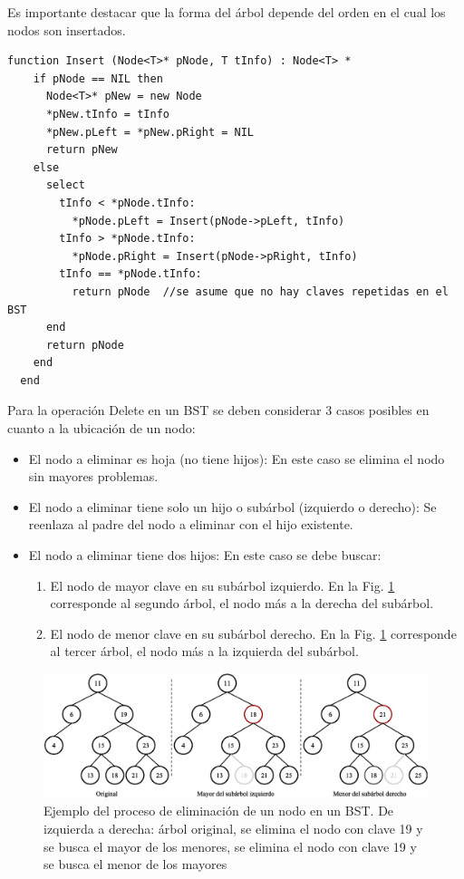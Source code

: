 Es importante destacar que la forma del árbol depende del orden en el cual los nodos son insertados.

\begin{lstlisting}[upquote=true, language=pseudo]
  function Insert (Node<T>* pNode, T tInfo) : Node<T> *
    if pNode == NIL then
      Node<T>* pNew = new Node
      *pNew.tInfo = tInfo
      *pNew.pLeft = *pNew.pRight = NIL
      return pNew
    else
      select
        tInfo < *pNode.tInfo:
          *pNode.pLeft = Insert(pNode->pLeft, tInfo)
        tInfo > *pNode.tInfo:  
          *pNode.pRight = Insert(pNode->pRight, tInfo)
        tInfo == *pNode.tInfo:
          return pNode	//se asume que no hay claves repetidas en el BST
      end
      return pNode
    end
  end
\end{lstlisting}

Para la operación Delete en un BST se deben considerar 3 casos posibles en cuanto a la ubicación de un nodo:
\begin{itemize}
\item El nodo a eliminar es hoja (no tiene hijos): En este caso se elimina el nodo sin
mayores problemas.
\item El nodo a eliminar tiene solo un hijo o subárbol (izquierdo o derecho): Se reenlaza
al padre del nodo a eliminar con el hijo existente.
\item El nodo a eliminar tiene dos hijos: En este caso se debe buscar:
\begin{enumerate}
\item El nodo de mayor clave en su subárbol izquierdo. En la Fig. \ref{fig:delsbt1} corresponde al segundo árbol, el nodo más a la derecha del subárbol.
\item El nodo de menor clave en su subárbol derecho. En la Fig. \ref{fig:delsbt1} corresponde al tercer árbol, el nodo más a la izquierda del subárbol.
\end{enumerate}
\end{itemize}

\begin{figure}[htpb!]
  \begin{center}
    \includegraphics[width=1.0\columnwidth]{images/BSTDelete1.eps}
  \end{center}
  \caption{Ejemplo del proceso de eliminación de un nodo en un BST. De izquierda a derecha: árbol original, se elimina el nodo con clave 19 y se busca el mayor de los menores, se elimina el nodo con clave 19 y se busca el menor de los mayores}
  \label{fig:delsbt1}
\end{figure}

